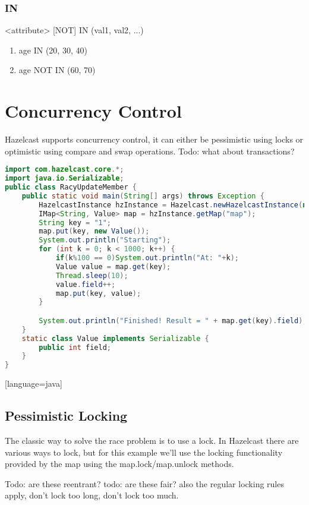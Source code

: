 \subsubsection{IN}
<attribute> [NOT] IN (val1, val2, ...)
\begin{enumerate}
\item age IN (20, 30, 40)
\item age NOT IN (60, 70)
\end{enumerate}

\section{Concurrency Control}
Hazelcast supports concurrency control, it can either be pessimistic using locks or optimistic using compare and swap operations. Todo: what about transactions?

\begin{lstlisting}[language=java]
import com.hazelcast.core.*;
import java.io.Serializable;
public class RacyUpdateMember {
    public static void main(String[] args) throws Exception {
        HazelcastInstance hzInstance = Hazelcast.newHazelcastInstance(null);
        IMap<String, Value> map = hzInstance.getMap("map");
        String key = "1";
        map.put(key, new Value());
        System.out.println("Starting");
        for (int k = 0; k < 1000; k++) {
            if(k%100 == 0)System.out.println("At: "+k);
            Value value = map.get(key);
            Thread.sleep(10);
            value.field++;
            map.put(key, value);
        }

        System.out.println("Finished! Result = " + map.get(key).field);
    }
    static class Value implements Serializable {
        public int field;
    }
}
\end{lstlisting}[language=java]

\subsection{Pessimistic Locking}
The classic way to solve the race problem is to use a lock. In Hazelcast there are various ways to lock, but for this example we'll use the locking functionality provided by the map using the map.lock/map.unlock methods.

Todo: are these reentrant?
todo: are these fair?
also the regular locking rules apply, don't lock too long, don't lock too much.

